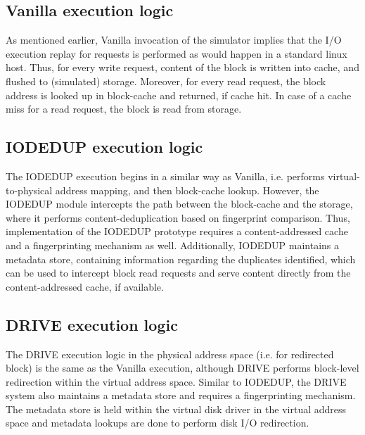\subsection{Vanilla execution logic}
As mentioned earlier, Vanilla invocation of the simulator implies that
the I/O execution replay for requests is performed as would happen
in a standard linux host. Thus, for every write request, content of
the block is written into cache, and flushed to (simulated) storage. 
Moreover, for every read request, the block address is looked up in 
block-cache and returned, if cache hit. In case of a cache miss for a
read request, the block is read from storage.

\subsection{IODEDUP execution logic}
The IODEDUP execution begins in a similar way as Vanilla, i.e. 
performs virtual-to-physical address mapping, and then block-cache lookup.
However, the IODEDUP module intercepts the path between the block-cache
and the storage, where it performs content-deduplication based on 
fingerprint comparison. Thus, implementation of the IODEDUP prototype requires 
a content-addressed cache and a fingerprinting mechanism as well.
Additionally, IODEDUP maintains a metadata store, containing 
information regarding the duplicates identified, which can be used 
to intercept block read requests and serve content directly from the
content-addressed cache, if available.

\subsection{DRIVE execution logic}
The DRIVE execution logic in the physical address space (i.e. for redirected
block) is the same as the Vanilla execution, although DRIVE performs block-level
redirection within the virtual address space. Similar to IODEDUP, the
DRIVE system also maintains a metadata store and requires a fingerprinting
mechanism. The metadata store is held within the virtual disk driver in
the virtual address space and metadata lookups are done to perform
disk I/O redirection. %


